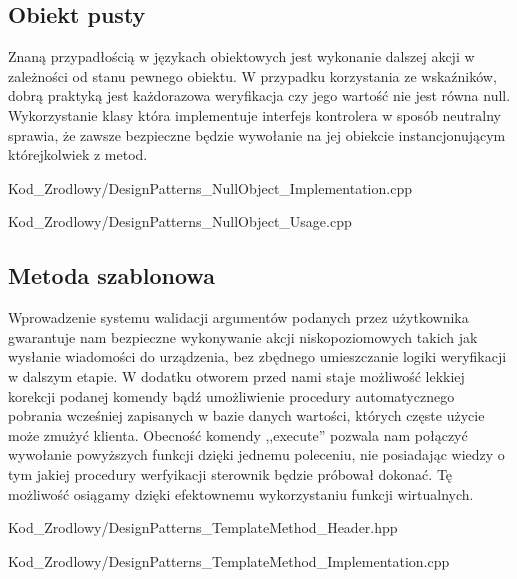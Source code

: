     \subsection{Obiekt pusty}
        Znaną przypadłością w językach obiektowych jest wykonanie dalszej akcji w zależności od stanu pewnego obiektu.
        W przypadku korzystania ze wskaźników, dobrą praktyką jest każdorazowa weryfikacja czy jego wartość nie jest równa null.
        Wykorzystanie klasy która implementuje interfejs kontrolera w sposób neutralny sprawia, że zawsze bezpieczne będzie wywołanie na jej obiekcie 
        instancjonującym którejkolwiek z metod.
        
            {Kod_Zrodlowy/DesignPatterns_NullObject_Implementation.cpp}
        
            {Kod_Zrodlowy/DesignPatterns_NullObject_Usage.cpp}
    \newpage
    \subsection{Metoda szablonowa}
        Wprowadzenie systemu walidacji argumentów podanych przez użytkownika gwarantuje nam bezpieczne wykonywanie akcji niskopoziomowych takich
        jak wysłanie wiadomości do urządzenia, bez zbędnego umieszczanie logiki weryfikacji w dalszym etapie. W dodatku otworem przed nami staje
        możliwość lekkiej korekcji podanej komendy bądź umożliwienie procedury automatycznego pobrania wcześniej zapisanych w bazie danych wartości,
        których częste użycie może zmużyć klienta. Obecność komendy ,,execute'' pozwala nam połączyć wywołanie powyższych funkcji dzięki jednemu poleceniu,
        nie posiadając wiedzy o tym jakiej procedury werfyikacji sterownik będzie próbował dokonać. Tę możliwość osiągamy dzięki efektownemu wykorzystaniu
        funkcji wirtualnych.
        
            {Kod_Zrodlowy/DesignPatterns_TemplateMethod_Header.hpp}
        
            {Kod_Zrodlowy/DesignPatterns_TemplateMethod_Implementation.cpp}
